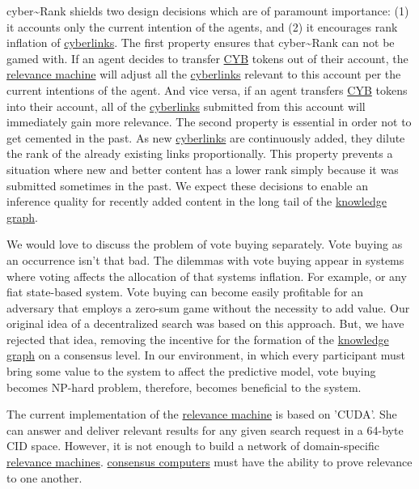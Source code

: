 \documentclass[8pt,oneside]{amsart}
\newcommand{\linkgreen}[2]{\href{#1}{\color{green}{#2}}}
\begin{document}
cyber\~{}Rank shields two design decisions which are of paramount importance: (1) it accounts only the current intention of the agents, and (2) it encourages rank inflation of {\hyperref[cyberlinks]{cyberlinks}}. The first property ensures that cyber\~{}Rank can not be gamed with. If an agent decides to transfer {\hyperref[cyb]{CYB}} tokens out of their account, the {\hyperref[relevance-machine]{relevance machine}} will adjust all the {\hyperref[cyberlinks]{cyberlinks}} relevant to this account per the current intentions of the agent. And vice versa, if an agent transfers {\hyperref[cyb]{CYB}} tokens into their account, all of the {\hyperref[cyberlinks]{cyberlinks}} submitted from this account will immediately gain more relevance. The second property is essential in order not to get cemented in the past. As new {\hyperref[cyberlinks]{cyberlinks}} are continuously added, they dilute the rank of the already existing links proportionally. This property prevents a situation where new and better content has a lower rank simply because it was submitted sometimes in the past. We expect these decisions to enable an inference quality for recently added content in the long tail of the {\hyperref[knowledge-graph]{knowledge graph}}.

We would love to discuss the problem of vote buying separately. Vote buying as an occurrence isn't that bad. The dilemmas with vote buying appear in systems where voting affects the allocation of that systems inflation. For example, \linkgreen{http://ipfs.io/ipfs/QmepU77tqMAHHuiSASUvUnu8f8ENuPF2Kfs97WjLn8vAS3}{Steem}
or any fiat state-based system. Vote buying can become easily profitable for an adversary that employs a zero-sum game without the necessity to add value. Our original idea of a decentralized search was based on this approach. But, we have rejected that idea, removing the incentive for the formation of the {\hyperref[knowledge-graph]{knowledge graph}} on a consensus level. In our environment, in which every participant must bring some value to the system to affect the predictive model, vote buying becomes NP-hard problem, therefore, becomes beneficial to the system.

The current implementation of the {\hyperref[relevance-machine]{relevance machine}} is based on 'CUDA'. She can answer and deliver relevant results for any given search request in a 64-byte CID space. However, it is not enough to build a network of domain-specific {\hyperref[relevance-machine]{relevance machines}}. {\hyperref[consensus-computer]{consensus computers}} must have the ability to prove relevance to one another.
\end{document}
